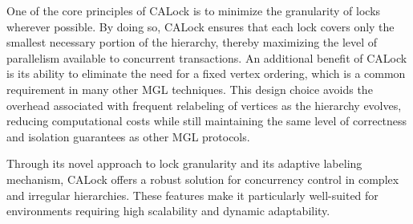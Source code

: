One of the core principles of CALock is to minimize the granularity of locks wherever possible. By doing so, CALock ensures that each lock covers only the smallest necessary portion of the hierarchy, thereby maximizing the level of parallelism available to concurrent transactions. An additional benefit of CALock is its ability to eliminate the need for a fixed vertex ordering, which is a common requirement in many other MGL techniques. This design choice avoids the overhead associated with frequent relabeling of vertices as the hierarchy evolves, reducing computational costs while still maintaining the same level of correctness and isolation guarantees as other MGL protocols.

Through its novel approach to lock granularity and its adaptive labeling mechanism, CALock offers a robust solution for concurrency control in complex and irregular hierarchies. These features make it particularly well-suited for environments requiring high scalability and dynamic adaptability.







